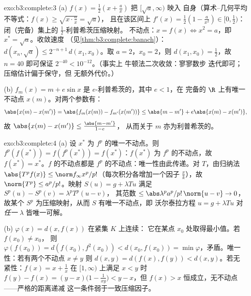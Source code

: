 \begin{solution}{exo:b3:complete:3}
(a) $f(x) = \frac12(x + \frac ax)$ 把 $[\sqrt a, \infty)$ 映入
自身（算术–几何平均不等式：$f(x) \geq \sqrt{x \cdot \frac ax} = \sqrt a$），
且在该区间上 $f'(x) = \frac12(1 - \frac a{x^2}) \in [0, \frac12)$：
闭（完备）集上的 $\frac12$-利普希茨压缩映射。
不动点：$x = f(x) \iff x^2 = a$，即 $x^* = \sqrt a$。收敛速度
（见\cref{thm:b3:complete:banach}）：$d(x_n, \sqrt a) \leq
2^{-n+1}\,d(x_1, x_0)$。取 $a = 2$，$x_0 = 2$，则 $d(x_1, x_0) =
\frac12$，故 $n = 40$ 即可保证 $2^{-40} < 10^{-12}$。（事实上
牛顿法二次收敛：寥寥数步
迭代即可；压缩估计偏于保守，但
无额外代价。）

(b) $f_m(x) = m + e\sin x$ 是 $e$-利普希茨的，其中 $e < 1$，在
完备的 $\R$ 上有唯一不动点 $x(m)$。对两个参数有：
\[
\abs{x(m) - x(m')} = \abs{f_m(x(m)) - f_{m'}(x(m'))}
\leq \abs{m - m'} + e\abs{x(m) - x(m')},
\]
故 $\abs{x(m) - x(m')} \leq \frac{\abs{m - m'}}{1 - e}$，
从而关于 $m$ 亦为利普希茨的。
\end{solution}

\begin{solution}{exo:b3:complete:4}
(a) 设 $x^*$ 为 $f^p$ 的唯一不动点。则
$f^p(f(x^*)) = f(f^p(x^*)) = f(x^*)$：$f(x^*)$ 为
$f^p$ 的不动点，故 $f(x^*) = x^*$。$f$ 的不动点都是
$f^p$ 的不动点：唯一性由此传递。对 $T$，由归纳法 $\abs{T^pf(x)}
\leq \norm f_\infty x^p/p!$（每次积分各增加一个因子
$\frac xk$），故 $\norm{T^p} \leq a^p/p!$。映射 $S(u) = g +
\lambda Tu$ 满足 $S^p(u) - S^p(v) = \lambda^pT^p(u - v)$，
其范数 $\leq \abs\lambda^pa^p/p!\,\norm{u - v} \to 0$，故某个
$S^p$ 为压缩映射，从而 $S$ 有唯一不动点，即
沃尔泰拉方程 $u = g + \lambda Tu$ 对
\emph{任一} $\lambda$ 皆唯一可解。

(b) $\varphi(x) = d(x, f(x))$ 在紧集 $K$ 上连续：
它在某点 $x_0$ 处取得最小值。若 $f(x_0) \neq x_0$，
则 $\varphi(f(x_0)) = d(f(x_0), f^2(x_0)) < d(x_0, f(x_0)) =
\min\varphi$，矛盾。唯一性：若有两个不动点 $x \ne y$
则 $d(x,y) = d(f(x), f(y)) < d(x,y)$。若无
紧性：$f(x) = x + \frac1x$ 在 $[1, \infty)$ 上满足
$x < y$ 时 $f(y) - f(x) = (y - x)\bigl(1 - \frac1{xy}\bigr) <
y - x$，但 $f(x) > x$ 恒成立，无不动点——严格的距离递减
这一条件弱于一致压缩因子。
\end{solution}

